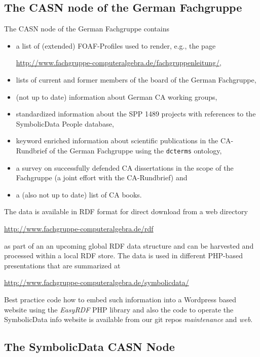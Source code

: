 \documentclass{llncs}
\newcommand{\SD}{{\sc Symbo\-lic\-Data}}
\begin{document}
\subsection*{The CASN node of the German Fachgruppe}

The CASN node of the German Fachgruppe contains  
\begin{itemize}
\item a list of (extended) FOAF-Profiles used to render, e.g., the page
  \begin{center}
    \url{http://www.fachgruppe-computeralgebra.de/fachgruppenleitung/},
  \end{center}
\item lists of current and former members of the board of the German
  Fachgruppe,
\item (not up to date) information about German CA working groups, 
\item standardized information about the SPP 1489 projects with references to
  the {\SD} People database,
\item keyword enriched information about scientific publications in the
  CA-Rund\-brief of the German Fachgruppe using the \texttt{dcterms} ontology,
\item a survey on successfully defended CA dissertations in the scope of the
  Fachgruppe (a joint effort with the CA-Rundbrief) and
\item a (also not up to date) list of CA books.
\end{itemize}
The data is available in RDF format for direct download from a web directory
\begin{center}
  \url{http://www.fachgruppe-computeralgebra.de/rdf}
\end{center}
as part of an an upcoming global RDF data structure and can be harvested and
processed within a local RDF store. The data is used in different PHP-based
presentations that are summarized at
\begin{center}
  \url{http://www.fachgruppe-computeralgebra.de/symbolicdata/}
\end{center}
Best practice code how to embed such information into a Wordpress based
website using the \emph{EasyRDF} PHP library and also the code to operate the
{\SD} info website \cite{sdinfo} is available from our git repos
\emph{maintenance} and \emph{web}.

\subsection*{The {\SD} CASN Node}
\end{document}

